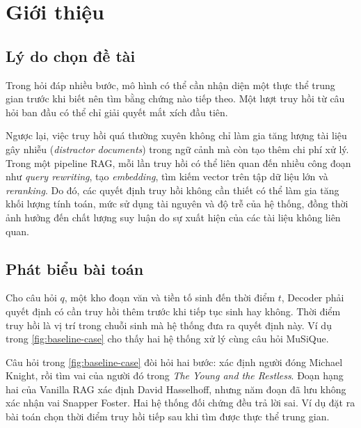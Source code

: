 \chapter{Giới thiệu}
\label{chap:intro}
\section{Lý do chọn đề tài}
Trong hỏi đáp nhiều bước, mô hình có thể cần nhận diện một thực thể trung gian trước khi biết nên tìm bằng chứng nào tiếp theo. Một lượt truy hồi từ câu hỏi ban đầu có thể chỉ giải quyết mắt xích đầu tiên.

Ngược lại, việc truy hồi quá thường xuyên không chỉ làm gia tăng lượng tài liệu gây nhiễu (\emph{distractor documents}) trong ngữ cảnh mà còn tạo thêm chi phí xử lý. Trong một pipeline RAG, mỗi lần truy hồi có thể liên quan đến nhiều công đoạn như \emph{query rewriting}, tạo \emph{embedding}, tìm kiếm vector trên tập dữ liệu lớn và \emph{reranking}. Do đó, các quyết định truy hồi không cần thiết có thể làm gia tăng khối lượng tính toán, mức sử dụng tài nguyên và độ trễ của hệ thống, đồng thời ảnh hưởng đến chất lượng suy luận do sự xuất hiện của các tài liệu không liên quan.

\section{Phát biểu bài toán}
Cho câu hỏi \(q\), một kho đoạn văn và tiền tố sinh đến thời điểm \(t\), Decoder phải quyết định có cần truy hồi thêm trước khi tiếp tục sinh hay không. Thời điểm truy hồi là vị trí trong chuỗi sinh mà hệ thống đưa ra quyết định này. Ví dụ trong \cref{fig:baseline-case} cho thấy hai hệ thống xử lý cùng câu hỏi MuSiQue.

\begin{quote}\SingleSpacing
\captionsetup{hypcap=false}

\par\nopagebreak[4]
\label{fig:baseline-case}
\end{quote}

Câu hỏi trong \cref{fig:baseline-case} đòi hỏi hai bước: xác định người đóng Michael Knight, rồi tìm vai của người đó trong \emph{The Young and the Restless}. Đoạn hạng hai của Vanilla RAG xác định David Hasselhoff, nhưng năm đoạn đã lưu không xác nhận vai Snapper Foster. Hai hệ thống đối chứng đều trả lời sai. Ví dụ đặt ra bài toán chọn thời điểm truy hồi tiếp sau khi tìm được thực thể trung gian.

